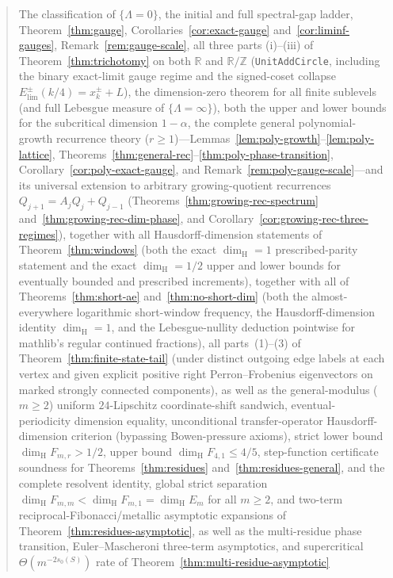 \documentclass[11pt]{article}
\theoremstyle{definition}
\theoremstyle{remark}
\newcommand{\R}{\mathbb{R}}
\newcommand{\Z}{\mathbb{Z}}
\newcommand{\dimH}{\dim_{\mathrm{H}}}
\newcommand{\Lam}{\Lambda}
\begin{document}
\begin{abstract}
The classification of $\{\Lam=0\}$, the initial and full spectral-gap ladder,
Theorem~\ref{thm:gauge},
Corollaries~\ref{cor:exact-gauge} and~\ref{cor:liminf-gauges},
Remark~\ref{rem:gauge-scale}, all three parts (i)--(iii) of
Theorem~\ref{thm:trichotomy} on both $\R$ and $\R/\Z$ (\texttt{UnitAddCircle},
including the binary exact-limit gauge regime and the signed-coset collapse
$E_{\mathrm{lim}}^\pm(k/4)=x_k^\pm+L$), the dimension-zero theorem for all
finite sublevels (and full Lebesgue measure of $\{\Lam=\infty\}$), both the upper
and lower bounds for the subcritical dimension $1-\alpha$, the complete
general polynomial-growth recurrence theory ($r\ge1$)---Lemmas~\ref{lem:poly-growth}--\ref{lem:poly-lattice},
Theorems~\ref{thm:general-rec}--\ref{thm:poly-phase-transition},
Corollary~\ref{cor:poly-exact-gauge}, and Remark~\ref{rem:poly-gauge-scale}---and
its universal extension to arbitrary growing-quotient recurrences
$Q_{j+1}=A_jQ_j+Q_{j-1}$ (Theorems~\ref{thm:growing-rec-spectrum}
and~\ref{thm:growing-rec-dim-phase}, and
Corollary~\ref{cor:growing-rec-three-regimes}), together
with all Hausdorff-dimension statements of Theorem~\ref{thm:windows} (both the
exact $\dimH=1$ prescribed-parity statement and the exact $\dimH=1/2$ upper and lower bounds for eventually bounded and prescribed
increments), together with all of Theorems~\ref{thm:short-ae} and~\ref{thm:no-short-dim}
(both the almost-everywhere logarithmic short-window frequency, the
Hausdorff-dimension identity $\dimH=1$, and the Lebesgue-nullity deduction
pointwise for mathlib's regular continued fractions), all parts~(1)--(3) of
Theorem~\ref{thm:finite-state-tail} (under distinct outgoing edge labels at each
vertex and given explicit positive right Perron--Frobenius eigenvectors on marked
strongly connected components), as well as the general-modulus ($m\ge2$)
uniform $24$-Lipschitz coordinate-shift sandwich, eventual-periodicity dimension
equality, unconditional transfer-operator Hausdorff-dimension criterion
(bypassing Bowen-pressure axioms), strict lower bound $\dimH F_{m,r}>1/2$, upper
bound $\dimH F_{4,1}\le 4/5$, step-function certificate soundness for
Theorems~\ref{thm:residues} and~\ref{thm:residues-general}, and the complete
resolvent identity, global strict separation $\dimH F_{m,m}<\dimH F_{m,1}=\dimH E_m$
for all $m\ge2$, and two-term reciprocal-Fibonacci/metallic asymptotic expansions of
Theorem~\ref{thm:residues-asymptotic}, as well as the multi-residue phase
transition, Euler--Mascheroni three-term asymptotics, and supercritical
$\Theta(m^{-2s_0(S)})$ rate of Theorem~\ref{thm:multi-residue-asymptotic}

\end{abstract}
\end{document}
